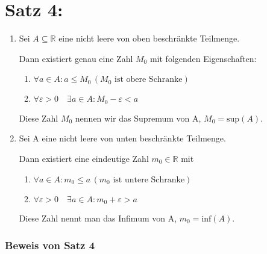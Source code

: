 \documentclass[12pt,a4paper,leqno]{article}
\begin{document}
  \section*{Satz 4:} 
  
  \renewcommand{\theenumi}{(\arabic{enumi})}
  \renewcommand{\labelenumi}{\theenumi}
  \begin{enumerate}
    \item Sei $A\subseteq\mathbb{R}$ eine nicht leere von oben beschränkte Teilmenge.
      
      Dann existiert genau eine Zahl $M_0$ mit folgenden Eigenschaften:
      
      \renewcommand{\theenumii}{(\roman{enumii})}
      \renewcommand{\labelenumii}{\theenumii}
      \begin{enumerate}
        \item $\forall a \in A : a\leq M_0 \,(M_0 \textrm{ ist obere Schranke})$
        \item $\forall \varepsilon>0\quad \exists a\in A: M_0-\varepsilon<a$
      \end{enumerate}
      
      Diese Zahl $M_0$ nennen wir das Supremum von A, $M_0= \textrm{sup}(A)$.
    \item Sei A eine nicht leere von unten beschränkte Teilmenge.
      
      Dann existiert eine eindeutige Zahl $m_0\in \mathbb{R}$ mit
      
      \begin{enumerate}
        \item $\forall a \in A : m_0\leq a \,(m_0 \textrm{ ist untere Schranke})$
        \item $\forall \varepsilon>0\quad \exists a\in A: m_0+\varepsilon>a$
      \end{enumerate}
      
      Diese Zahl nennt man das Infimum von A, $m_0=\textrm{inf}(A)$.
      
  \end{enumerate}
  
  
  \subsubsection*{Beweis von Satz 4}
  
\end{document}
